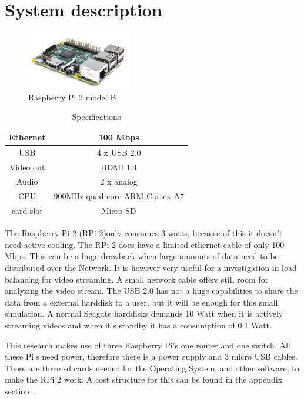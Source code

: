 \documentclass{sig-alternate-br}
\begin{document}
\section{System description}\label{sec:system}

\begin{figure}[H]
	\centering 
	\includegraphics[width=0.4\textwidth]{Pi2ModB1GB_-comp.jpeg}
	\caption{Raspberry Pi 2 model B}
	\label{fig:raspberry} %
\end{figure}
\begin{table}[H]
	\centering \caption{Specifications}
	\begin{tabular}{|c|c|} \hline
		Ethernet & 100 Mbps \\ \hline
		USB & 4 x USB 2.0 \\ \hline
		Video out & HDMI 1.4 \\ \hline
		Audio & 2 x analog \\ \hline
		CPU & 900MHz quad-core ARM Cortex-A7 \\ \hline
		card slot & Micro SD  \\ \hline
	\end{tabular}
	\label{tab:Specificaties}
\end{table}
The Raspberry Pi 2 (RPi 2)only consumes 3 watts, because of this it doesn't need active cooling. The RPi 2 does have a limited ethernet cable of only 100 Mbps. This can be a huge drawback when large amounts of data need to be distributed over the Network. It is however very useful for a investigation in load balancing for video streaming. A small network cable offers still room for analyzing the video stream. The USB 2.0 has not a huge capabilities to share the data from a external harddisk to a user, but it will be enough for this small simulation. A normal Seagate harddisks demands 10 Watt when it is actively streaming videos and when it's standby it has a consumption of 0.1  Watt.

This research makes use of three Raspberry Pi's one router and one switch. All these Pi's need power, therefore there is a power supply and 3 micro USB cables. There are three sd cards needed for the Operating System, and other software, to make the RPi 2 work. A cost structure for this can be found in the appendix section~.
\end{document}
